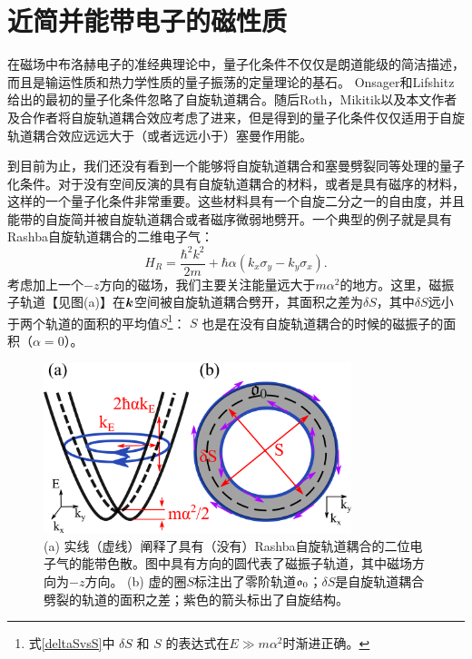 \chapter{近简并能带电子的磁性质}

在磁场中布洛赫电子的准经典理论中，量子化条件不仅仅是朗道能级的简洁描述，而且是输运性质\cite{SdH}和热力学性质\cite{dHvA}的量子振荡的定量理论的基石。 Onsager\cite{Onsager}和Lifshitz\cite{lifshitz_kosevich,lifshitz_kosevich_jetp}给出的最初的量子化条件忽略了自旋轨道耦合。随后Roth\cite{rotheffham,rothmag}，Mikitik\cite{Mikitik_quantizationrule}以及本文作者及合作者\cite{topoferm,100p}将自旋轨道耦合效应考虑了进来，但是得到的量子化条件仅仅适用于自旋轨道耦合效应远远大于（或者远远小于）塞曼作用能。


到目前为止，我们还没有看到一个能够将自旋轨道耦合和塞曼劈裂同等处理的量子化条件。对于没有空间反演的具有自旋轨道耦合的材料，或者是具有磁序的材料，这样的一个量子化条件非常重要。这些材料具有一个自旋二分之一的自由度，并且能带的自旋简并被自旋轨道耦合或者磁序微弱地劈开。一个典型的例子就是具有Rashba自旋轨道耦合的二维电子气：
\begin{equation}
H_R=\frac{{\hbar^2} k^2}{2m}+\hbar\alpha  (k_{x}\sigma_{y}-k_{y}\sigma_{x}).\label{eq:Rashba-Hamiltonian}
\end{equation}
考虑加上一个$-z$方向的磁场，我们主要关注能量远大于$m\alpha^2$的地方。这里，磁振子轨道【见图(a)】在$\boldsymbol{k}$空间被自旋轨道耦合劈开，其面积之差为$\delta S$，其中$\delta S$远小于两个轨道的面积的平均值$S$\footnote{式\ref{deltaSvsS}中 $\delta S$ 和 $S$ 的表达式在$E{\gg}m\alpha^2$时渐进正确。}：
$S$ 也是在没有自旋轨道耦合的时候的磁振子的面积（$\alpha{=}0$）。

\begin{figure}
	\includegraphics[width=0.8\textwidth]{../figures/orbits.png}
	\centering
	\caption{(a) 实线（虚线）阐释了具有（没有）Rashba自旋轨道耦合的二位电子气的能带色散。图中具有方向的圆代表了磁振子轨道，其中磁场方向为$-z$方向。 (b) 虚的圈$S$标注出了零阶轨道$\mathfrak{o}_0$；$\delta S$是自旋轨道耦合劈裂的轨道的面积之差；紫色的箭头标出了自旋结构。\label{fig:orbits}}
\end{figure}

